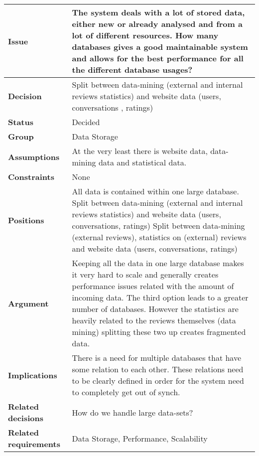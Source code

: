 
\label{dd:split}
\begin{tabular}{ l  p{10cm}}
\hline
\bf Issue & The system deals with a lot of stored data, either new or already analysed and from a lot of different resources. How many databases gives a good maintainable system and allows for the best performance for all the different database usages? \\
\hline
\bf Decision & Split between data-mining (external and internal reviews statistics) and website data (users, conversations , ratings) \\
\hline
\bf Status & Decided \\
\hline
\bf Group & Data Storage \\
\hline
\bf Assumptions & At the very least there is website data, data-mining data and statistical data. \\
\hline
\bf Constraints & None \\
\hline
\bf Positions & All data is contained within one large database. \newline\newline
Split between data-mining (external and internal reviews statistics) and website data (users, conversations, ratings)  \newline\newline
Split between data-mining (external reviews), statistics on (external) reviews and website data (users, conversations, ratings)
 \\
\hline
\bf Argument & Keeping all the data in one large database makes it very hard to scale and generally creates performance issues related with the amount of incoming data. 
The third option leads to a greater number of databases. However the statistics are heavily related to the reviews themselves (data mining) splitting these two up creates fragmented data. 
 \\
\hline
\bf Implications & There is a need for multiple databases that have some relation to each other. These relations need to be clearly defined in order for the system need to completely get out of synch. \\
\hline
\bf Related decisions & How do we handle large data-sets? \\
\hline
\bf Related requirements  & Data Storage, Performance, Scalability \\
\hline
\end{tabular}
